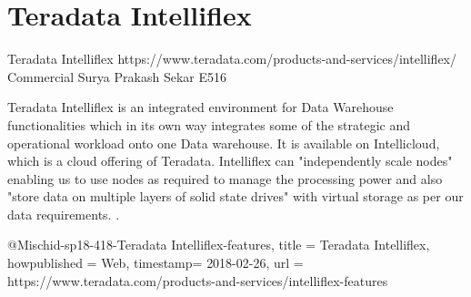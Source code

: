 \section{Teradata Intelliflex}

Teradata Intelliflex
https://www.teradata.com/products-and-services/intelliflex/
Commercial
Surya Prakash Sekar
E516

Teradata Intelliflex is an integrated environment for Data Warehouse 
functionalities which in its own way integrates some of the strategic and 
operational workload onto one Data warehouse. It is available on Intellicloud, 
which is a cloud offering of Teradata. Intelliflex can "independently 
scale nodes" enabling us to use nodes as required to manage the processing 
power and also "store data on multiple layers of solid state drives" with 
virtual storage as per our data requirements. 
\cite{hid-sp18-418-Teradata Intelliflex-features}. 

@Misc{hid-sp18-418-Teradata Intelliflex-features,
title = {Teradata Intelliflex},
howpublished = {Web},
timestamp= {2018-02-26},
url = {https://www.teradata.com/products-and-services/intelliflex-features}
}